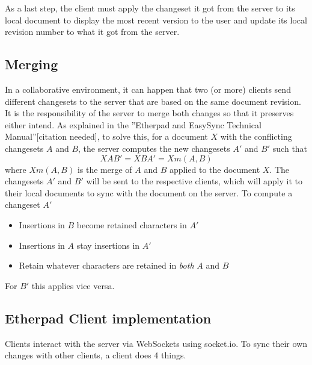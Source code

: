 
As a last step, the client must apply the changeset it got from the server to its local document to display the most recent version to the user and update its local revision number to what it got from the server.

\subsection{Merging}

In a collaborative environment, it can happen that two (or more) clients send different changesets to the server that are based on the same document revision. It is the responsibility of the server to merge both changes so that it preserves either intend. As explained in the ''Etherpad and EasySync Technical Manual''[citation needed], to solve this, for a document $X$ with the conflicting changesets $A$ and $B$, the server computes the new changesets $A'$ and $B'$ such that
$$XAB' = XBA' = Xm(A,B)$$
where $Xm(A,B)$ is the merge of $A$ and $B$ applied to the document $X$. The changesets $A'$ and $B'$ will be sent to the respective clients, which will apply it to their local documents to sync with the document on the server. To compute a changeset $A'$

\begin{itemize}
\item Insertions in $B$ become retained characters in $A'$
\item Insertions in $A$ stay insertions in $A'$
\item Retain whatever characters are retained in \emph{both} $A$ and $B$
\end{itemize}

For $B'$ this applies vice versa. %

\subsection{Etherpad Client implementation}

Clients interact with the server via WebSockets using socket.io. To sync their own changes with other clients, a client does 4 things.

